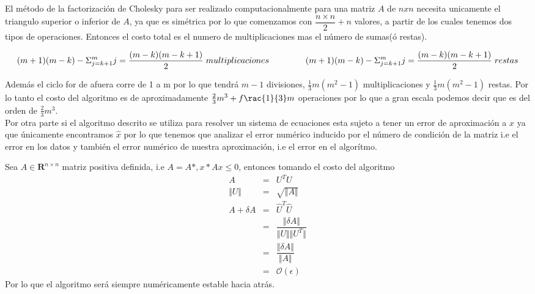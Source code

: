 \documentclass[12pt]{article}
\begin{document}
El m\'etodo de la factorización de Cholesky para ser realizado computacionalmente para una matriz $A$ de $nxn$ necesita unicamente el triangulo superior o inferior de $A$, ya que es simétrica por lo que comenzamos con $\dfrac{n \times n}{2} + n$ valores, a partir de los cuales tenemos dos tipos de operaciones. Entonces el costo total es el numero de multiplicaciones mas el número de sumas(ó restas).

\begin{equation*}
(m+1)(m-k) - \Sigma_{j=k+1}^m j = \dfrac{(m-k)(m-k+1)}{2} \; multiplicaciones \\

\qquad \qquad \; (m+1)(m-k) - \Sigma_{j=k+1}^m j = \dfrac{(m-k)(m-k+1)}{2} \; restas

\end{equation*}

Además el ciclo for de afuera corre de 1 a m por lo que tendrá $m-1$ divisiones, $\frac{1}{3}m(m^2-1)$ multiplicaciones y  $\frac{1}{3}m(m^2-1)$ restas. Por lo tanto el costo del algoritmo es de aproximadamente $\frac{2}{3}m^3 + f\rac{1}{3}m$ operaciones por lo que a gran escala podemos decir que es del orden de $\frac{2}{3}m^3$.\\ 

Por otra parte si el algoritmo descrito se utiliza para resolver un sistema de ecuaciones esta sujeto a tener un error de aproximación a $x$ ya que únicamente encontramos $\hat{x}$ por lo que tenemos que analizar el error numérico inducido por el número de condición de la matriz i.e el error en los datos y también el error numérico de nuestra aproximación, i.e el error en el algorítmo. 

Sea $A \in \mathbf{R}^{n \times n}$ matriz positiva definida, i.e $A = A*, x*Ax \leq 0 $, entonces tomando el costo del algoritmo
\begin{eqnarray*}
                 A &=& U^T U \\
     \Vert U \Vert &=& \sqrt{ \Vert A \Vert } \\
     A + \delta A  &=& \hat{U}^T \hat{U} \\
                   &=& \dfrac{\Vert \delta A \Vert}{\Vert U \Vert \Vert U^T \Vert}\\
                   &=& \dfrac{\Vert \delta A \Vert}{\Vert A \Vert}\\                   
                   &=& \mathcal{O}(\epsilon)          
\end{eqnarray*}
Por lo que el algoritmo será siempre numéricamente estable hacia atrás.  
\end{document}
